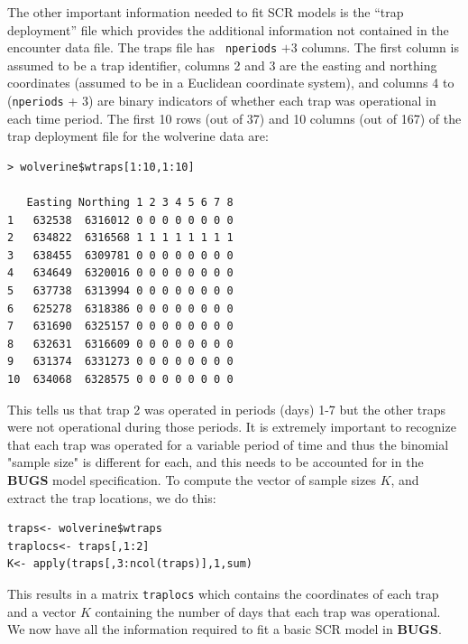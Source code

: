 The other important information needed to fit SCR models is the ``trap
deployment'' file which provides the additional information not
contained in the encounter data file. The traps file has \mbox{\tt
  nperiods} $+ 3$ columns. The first column is assumed to be a trap
identifier, columns 2 and 3 are the easting and northing coordinates
(assumed to be in a Euclidean coordinate system), and columns 4 to
(\mbox{\tt nperiods} + 3) are binary indicators of whether each trap
was operational in each time period. The first 10 rows (out of 37) and
10 columns (out of 167) of the trap deployment file for the wolverine
data are:
{\small
\begin{verbatim}
> wolverine$wtraps[1:10,1:10]

   Easting Northing 1 2 3 4 5 6 7 8 
1   632538  6316012 0 0 0 0 0 0 0 0
2   634822  6316568 1 1 1 1 1 1 1 1
3   638455  6309781 0 0 0 0 0 0 0 0
4   634649  6320016 0 0 0 0 0 0 0 0
5   637738  6313994 0 0 0 0 0 0 0 0
6   625278  6318386 0 0 0 0 0 0 0 0
7   631690  6325157 0 0 0 0 0 0 0 0
8   632631  6316609 0 0 0 0 0 0 0 0
9   631374  6331273 0 0 0 0 0 0 0 0
10  634068  6328575 0 0 0 0 0 0 0 0
\end{verbatim}
}
This tells us that trap 2 was operated in periods (days) 1-7 but the
other traps were not operational during those periods. It is extremely
important to recognize that each trap was operated for a variable
period of time and thus the binomial "sample size" is different for
each, and this needs to be accounted for in the {\bf BUGS} model
specification.  To compute the vector of sample sizes $K$, and extract
the trap locations, we do this:
\begin{verbatim}
traps<- wolverine$wtraps
traplocs<- traps[,1:2]
K<- apply(traps[,3:ncol(traps)],1,sum)
\end{verbatim}
This results in a matrix \mbox{\tt traplocs} which contains the coordinates of
each trap and a vector $K$ containing the number of days that each trap
was operational. We now have all the information required to fit a
basic SCR model in {\bf BUGS}.

